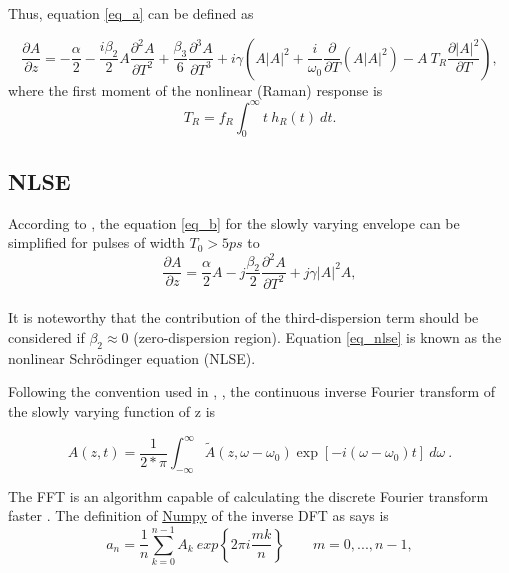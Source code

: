     Thus, equation \eqref{eq_a} can be defined as 
    
    \begin{equation}\label{eq_b}
        \frac{\partial A}{\partial z}=-\frac{\alpha}{2} - \frac{i \beta_2}{2}A \frac{\partial^2 A}{\partial T^2} +\frac{\beta_3}{6} \frac{\partial^3 A}{\partial T^3} +i \gamma   \left(A\left|A\right|^2+ \frac{i}{\omega_0} \frac{\partial}{\partial T} (A\left|A \right|^2)- A \ T_R \frac{\partial \left|A \right|^2}{\partial T} \right),
        \end{equation}
    where the first moment of the nonlinear (Raman) response is
    \begin{equation}\label{eq_TR}
        T_R = f_R\int_{0}^{\infty} t \ h_R(t) \ dt.
    \end{equation}

        
    \subsection{NLSE}
        According to \citep{AgrawalBook}, the equation  \eqref{eq_b} for the slowly varying envelope can be simplified for pulses of width $T_0 > 5 ps$ to
        \begin{equation}
                \frac{\partial A}{\partial z} = \frac{\alpha}{2}A-j \frac{\beta_2}{2}\frac{\partial^2A}{\partial T^2}+j\gamma|A|^2 A,
                \label{eq_nlse}
            \end{equation}
            \ \\
       It is noteworthy that the contribution of the third-dispersion term should be considered if $\beta_2 \approx 0$ (zero-dispersion region). Equation \eqref{eq_nlse} is known as the nonlinear Schrödinger equation (NLSE).

           Following the convention used in \cite{AgrawalBook}, \cite{dudley_taylor_2010} , the continuous inverse Fourier transform of the slowly varying function of z is
        
        \begin{equation}\label{eq_acft}
            A(z,t) = \frac{1}{2*\pi} \int_{-\infty}^{\infty} \tilde{A}(z,\omega-\omega_0)\exp{[-i(\omega-\omega_0)t]} \ d\omega \ .
        \end{equation}
        
        
        The FFT is an algorithm capable of calculating the discrete Fourier transform faster \citep{Lynch2018}. The definition of \href{https://numpy.org/doc/stable/index.html}{Numpy} of the inverse DFT as \cite{dft} says is 
        \begin{equation}\label{eq_dft}
            a_n = \frac{1}{n}\sum_{k=0}^{n-1} A_k \ exp\left\{ 2\pi i \frac{mk}{n} \right\} \qquad m = 0,...,n-1,
        \end{equation}

